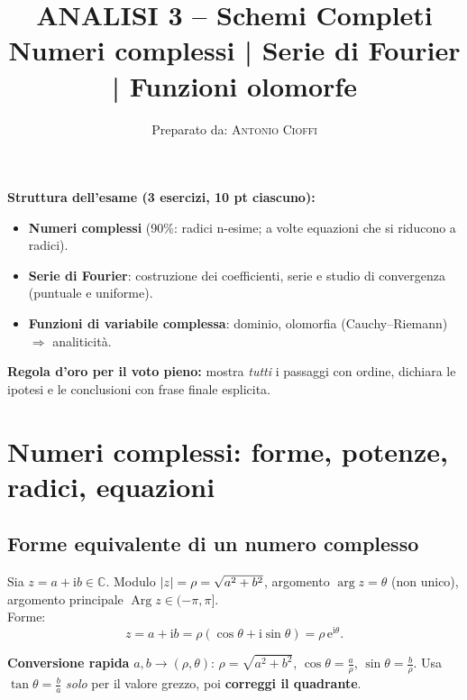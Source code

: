 \documentclass[11pt,a4paper]{article}
\title{\vspace{-1cm}\textbf{ANALISI 3 – Schemi Completi}\\
\large Numeri complessi \;|\; Serie di Fourier \;|\; Funzioni olomorfe}
\author{Preparato da: \textsc{Antonio Cioffi}}
\date{}
\newcommand{\C}{\mathbb{C}}
\newcommand{\e}{\mathrm{e}}
\newcommand{\ii}{\mathrm{i}}
\newcommand{\Arg}{\operatorname{Arg}}
\theoremstyle{definition}
\begin{document}
\maketitle
\vspace{-0.8em}
\begin{ideabox}
\textbf{Struttura dell'esame (3 esercizi, 10 pt ciascuno):}
\begin{itemize}
  \item \textbf{Numeri complessi} (90\%: radici n-esime; a volte equazioni che si riducono a radici).
  \item \textbf{Serie di Fourier}: costruzione dei coefficienti, serie e studio di convergenza (puntuale e uniforme).
  \item \textbf{Funzioni di variabile complessa}: dominio, olomorfia (Cauchy–Riemann) $\Rightarrow$ analiticità.
\end{itemize}
\textbf{Regola d'oro per il voto pieno:} mostra \emph{tutti} i passaggi con ordine, dichiara le ipotesi e le conclusioni con frase finale esplicita.
\end{ideabox}

\tableofcontents

\section{Numeri complessi: forme, potenze, radici, equazioni}

\subsection{Forme equivalente di un numero complesso}
\begin{defbox}
Sia $z=a+\ii b\in\C$. Modulo $\abs{z}=\rho=\sqrt{a^2+b^2}$, argomento $\arg z=\theta$ (non unico), argomento principale $\Arg z\in(-\pi,\pi]$.\\
Forme:
\[
z=a+\ii b=\rho(\cos\theta+\ii\sin\theta)=\rho\,\e^{\ii\theta}.
\]
\end{defbox}

\begin{ideabox}
\textbf{Conversione rapida} $a,b\to(\rho,\theta)$: $\rho=\sqrt{a^2+b^2}$,\; $\cos\theta=\frac{a}{\rho}$,\; $\sin\theta=\frac{b}{\rho}$.\;
Usa $\tan\theta=\frac{b}{a}$ \emph{solo} per il valore grezzo, poi \textbf{correggi il quadrante}.
\end{ideabox}
\end{document}
